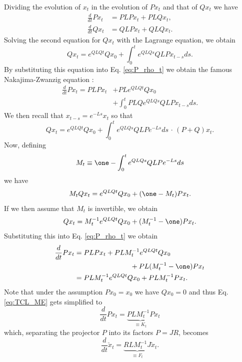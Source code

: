 \documentclass[10pt,aps,pra,twocolumn,showpacs,superscriptaddress,nobalancelastpage,notitlepage,nofootinbib,longbibliography]{revtex4-2}
\begin{document}
Dividing the evolution of $x_t$ in the evolution of $P x_t$ and that of $Q x_t$ we have 
\begin{align}
    \frac{d}{dt}P x_t &= P LP x_t + PLQ x_t,\label{eq:P_rho_t}\\
    \frac{d}{dt}Q x_t &= QLP x_t + QLQ x_t.
\end{align}
Solving the second equation for $Q x_t$ with the Lagrange equation, we obtain
\[Qx_t = e^{QLQ t} Qx_0 + \int_0^t e^{QLQ s }QLP x_{t-s} ds.\]
By substituting this equation into Eq. \eqref{eq:P_rho_t} we obtain the famous Nakajima-Zwanzig equation \cite{nakajima,zwanzig}:
\begin{align}
    \frac{d}{dt}P x_t = PLP x_t &+ PL e^{QLQ t} Qx_0 \nonumber\\&+\int_0^t PLQ e^{QLQ s }QLP x_{t-s} ds.
\end{align}
We then recall that 
\(x_{t-s} = e^{-L s}x_t\)
so that 
\[Qx_t = e^{QLQ t} Qx_0 +\int_0^t e^{QLQ s }QLP e^{-L s} ds\, \cdot\, (P + Q) x_t. \]
Now, defining 
\begin{equation}
    M_t \equiv \one - \int_0^t e^{QLQ s }QLP e^{-L s} ds
    \label{eq:M_t}
\end{equation}
we have 
\[M_t Qx_t = e^{QLQ t} Qx_0 + (\one-M_t) Px_t.\]
If we then assume that $M_t$ is invertible, we obtain 
\[Qx_t = M_t^{-1}e^{QLQ t} Qx_0 + (M_t^{-1} -\one) P x_t.\]
Substituting this into Eq. \eqref{eq:P_rho_t} we obtain 
\begin{align}
    \frac{d}{dt}Px_t &= PLP x_t + PLM_t^{-1}e^{QLQ t} Qx_0 \nonumber \\& \qquad\qquad\qquad\qquad+ PL (M_t^{-1}-\one) P x_t \nonumber\\ &= PLM_t^{-1}e^{QLQ t} Qx_0 + PLM_t^{-1} Px_t.
    \label{eq:TCL_ME}
\end{align}
Note that under the assumption $Px_0=x_0$ we have $Qx_0=0$ and thus Eq. \eqref{eq:TCL_ME} gets simplified to 
\begin{equation}
  \frac{d}{dt}Px_t = \underbrace{PLM_t^{-1} P}_{\equiv K_t} x_t  
  \label{eq:tcl_me_no_affine}
\end{equation}
which, separating the projector $P$ into its factors $P = JR$, becomes  
\begin{equation}
    \frac{d}{dt}\check{x}_t = \underbrace{RL M_t^{-1} J}_{\equiv F_t} \check{x}_t.
    \label{eq:tcl_me_reduced}
\end{equation}
\end{document}
